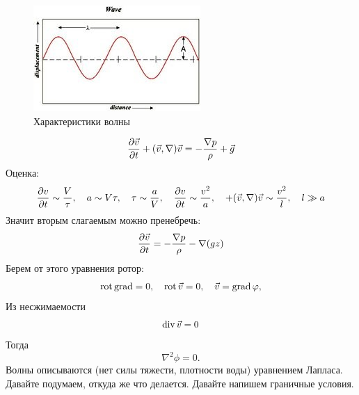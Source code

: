 \begin{figure}[H]
    \centering
    \includegraphics[scale=1.25]{photo/simple_wave.jpg}
    \caption{Характеристики волны}
    \label{fig:simplewave}
\end{figure}

\begin{gather}
	\label{eq}
	\pdv{\vec{v}}{t}+(\vec{v},\nabla)\vec{v}=-\frac{\nabla p}{\rho}+\vec{g}
\end{gather}
Оценка:
\begin{gather}
	\label{eq}
	\pdv{v}{t}\sim\frac{V}{\tau}, \quad a\sim V\tau, \quad \tau \sim \frac{a}{V},
	\quad \pdv{v}{t}\sim \frac{v^2}{a}, \quad +(\vec{v},\nabla)\vec{v}\sim \frac{v^2}{l},
	\quad l\gg a
\end{gather}
Значит вторым слагаемым можно пренебречь:
\begin{gather}
	\label{eq}
	\pdv{\vec{v}}{t}=-\frac{\nabla p}{\rho}-\nabla(gz)
\end{gather}
Берем от этого уравнения ротор:
\begin{equation}
	\operatorname{rot}\operatorname{grad}=0, \quad
	\operatorname{rot}\vec{v}=0, \quad \vec{v}=\operatorname{grad}\varphi,
\end{equation}
Из несжимаемости
\begin{equation}
	\operatorname{div}\vec{v}=0
\end{equation}
Тогда
\begin{equation}
	\nabla^2\phi=0.
\end{equation}
Волны описываются (нет силы тяжести, плотности воды) уравнением Лапласа. 
Давайте подумаем, откуда же что делается. 
Давайте напишем граничные условия.

